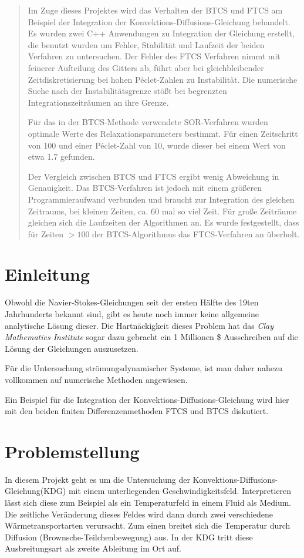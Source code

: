 \begin{abstract}
Im Zuge dieses Projektes wird das Verhalten der BTCS und FTCS am Beispiel der Integration der Konvektions-Diffusions-Gleichung behandelt. Es wurden zwei C++ Anwendungen zu Integration der Gleichung erstellt, die benutzt wurden um Fehler, Stabilität und Laufzeit der beiden Verfahren zu untersuchen. Der Fehler des FTCS Verfahren nimmt mit feinerer Aufteilung des Gitters ab, führt aber bei gleichbleibender Zeitdiskretisierung bei hohen Péclet-Zahlen zu Instabilität. Die numerische Suche nach der Instabilitätsgrenze stößt bei begrenzten Integrationszeiträumen an ihre Grenze.

Für das in der BTCS-Methode verwendete SOR-Verfahren wurden optimale Werte des Relaxationsparameters bestimmt. Für einen Zeitschritt von 100 und einer Péclet-Zahl von 10, wurde dieser bei einem Wert von etwa 1.7 gefunden.

Der Vergleich zwischen BTCS und FTCS ergibt wenig Abweichung in Genauigkeit. Das BTCS-Verfahren ist jedoch mit einem größeren Programmieraufwand verbunden und braucht zur Integration des gleichen Zeitraums, bei kleinen Zeiten, ca. 60 mal so viel Zeit. Für große Zeiträume gleichen sich die Laufzeiten der Algorithmen an. Es wurde festgestellt, dass für Zeiten $>100$ der BTCS-Algorithmus das FTCS-Verfahren an überholt.
\end{abstract}

\section{Einleitung}
Obwohl die Navier-Stokes-Gleichungen seit der ersten Hälfte des 19ten Jahrhunderts bekannt sind, gibt es heute noch immer keine allgemeine analytische Lösung dieser.
Die Hartnäckigkeit dieses Problem hat das \emph{Clay Mathematics Institute} sogar dazu gebracht ein 1 Millionen \$ Ausschreiben auf die Lösung der Gleichungen auszusetzen.

Für die Untersuchung strömungsdynamischer Systeme, ist man daher nahezu vollkommen auf numerische Methoden angewiesen.

Ein Beispiel für die Integration der Konvektions-Diffusions-Gleichung wird hier mit den beiden finiten Differenzenmethoden FTCS und BTCS
diskutiert.

\newpage
\section{Problemstellung}
In diesem Projekt geht es um die Untersuchung der Konvektions-Diffusions-Gleichung(KDG) mit einem unterliegenden Geschwindigkeitsfeld.
Interpretieren lässt sich diese zum Beispiel als ein Temperaturfeld in einem Fluid als Medium.
Die zeitliche Veränderung dieses Feldes wird dann durch zwei verschiedene Wärmetransportarten verursacht.
Zum einen breitet sich die Temperatur durch Diffusion (Brownsche-Teilchenbewegung) aus. In der KDG tritt diese Ausbreitungsart als zweite Ableitung im Ort auf.

